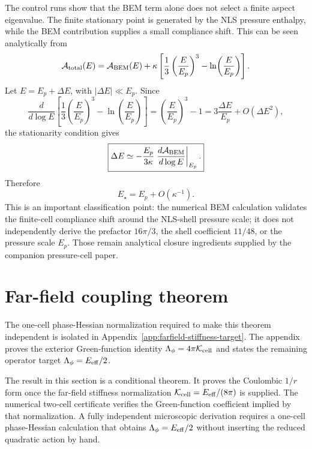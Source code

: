 \documentclass[11pt]{article}
\begin{document}
The control runs show that the BEM term alone does not select a finite aspect
eigenvalue.  The finite stationary point is generated by the NLS pressure
enthalpy, while the BEM contribution supplies a small compliance shift.  This
can be seen analytically from
\begin{equation}
  \mathcal A_{\rm total}(E)
  =
  \mathcal A_{\rm BEM}(E)
  +
  \kappa
  \left[
    \frac{1}{3}\left(\frac{E}{E_p}\right)^3
    -
    \ln\!\left(\frac{E}{E_p}\right)
  \right].
\end{equation}
Let \(E=E_p+\Delta E\), with \(|\Delta E|\ll E_p\).  Since
\begin{equation}
  \frac{d}{d\log E}
  \left[
    \frac{1}{3}\left(\frac{E}{E_p}\right)^3
    -
    \ln\!\left(\frac{E}{E_p}\right)
  \right]
  =
  \left(\frac{E}{E_p}\right)^3-1
  =
  3\frac{\Delta E}{E_p}
  +
  O(\Delta E^2),
\end{equation}
the stationarity condition gives
\begin{equation}
  \boxed{
  \Delta E
  \simeq
  -
  \frac{E_p}{3\kappa}
  \left.
  \frac{d\mathcal A_{\rm BEM}}{d\log E}
  \right|_{E_p}.
  }
  \label{eq:kappa-shift}
\end{equation}
Therefore
\begin{equation}
  E_\star=E_p+O(\kappa^{-1}).
\end{equation}
This is an important classification point: the numerical BEM calculation
validates the finite-cell compliance shift around the NLS-shell pressure scale;
it does not independently derive the prefactor \(16\pi/3\), the shell
coefficient \(11/48\), or the pressure scale \(E_p\).  Those remain analytical
closure ingredients supplied by the companion pressure-cell paper.

\section{Far-field coupling theorem}

The one-cell phase-Hessian normalization required to make this theorem independent is isolated in Appendix~\ref{app:farfield-stiffness-target}. The appendix proves the exterior Green-function identity \(\Lambda_\phi=4\pi\mathcal K_{\rm cell}\) and states the remaining operator target \(\Lambda_\phi=E_{\rm eff}/2\).


\label{sec:farfield-theorem}

The result in this section is a conditional theorem.  It proves the Coulombic
\(1/r\) form once the far-field stiffness normalization
\(\mathcal K_{\rm cell}=E_{\rm eff}/(8\pi)\) is supplied.  The numerical
two-cell certificate verifies the Green-function coefficient implied by that
normalization.  A fully independent microscopic derivation requires a one-cell
phase-Hessian calculation that obtains \(\Lambda_\phi=E_{\rm eff}/2\) without
inserting the reduced quadratic action by hand.
\end{document}
